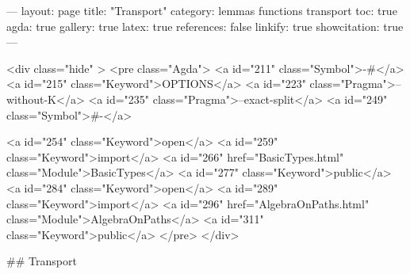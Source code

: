 
---
layout: page
title: "Transport"
category: lemmas functions transport
toc: true
agda: true
gallery: true
latex: true
references: false
linkify: true
showcitation: true
---

<div class="hide" >
<pre class="Agda">
<a id="211" class="Symbol">{-#</a> <a id="215" class="Keyword">OPTIONS</a> <a id="223" class="Pragma">--without-K</a> <a id="235" class="Pragma">--exact-split</a> <a id="249" class="Symbol">#-}</a>

<a id="254" class="Keyword">open</a> <a id="259" class="Keyword">import</a> <a id="266" href="BasicTypes.html" class="Module">BasicTypes</a> <a id="277" class="Keyword">public</a>
<a id="284" class="Keyword">open</a> <a id="289" class="Keyword">import</a> <a id="296" href="AlgebraOnPaths.html" class="Module">AlgebraOnPaths</a> <a id="311" class="Keyword">public</a>
</pre>
</div>

## Transport

